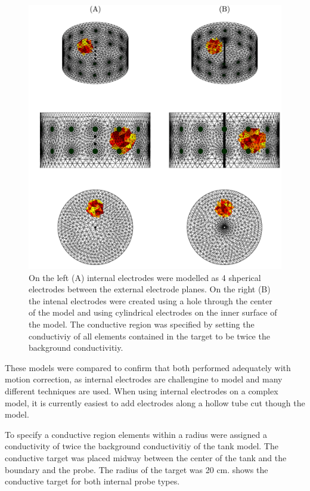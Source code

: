 \begin{figure}
    \centering
   \includegraphics[width=\textwidth]{chapter7-internal_elec_motion/imgs/probe_types.pdf} 
   \caption[Spherical and cylindrical internal electrodes]{\label{fig:probe_types} 
   On the left (A) internal electrodes were modelled as 4 shperical electrodes between the 
   external electrode planes. On the right (B) the intenal electrodes were created using 
   a hole through the center of the model and using cylindrical electrodes on the inner 
   surface of the model.
	The conductive region was specified by setting the conductiviy of all elements 
	contained in the target to be twice the background conductivitiy.}
\end{figure}

These models were compared to confirm that both 
performed adequately with motion correction, as internal electrodes 
are challengine to model and many different techniques are used. 
When using internal electrodes on a complex model, it is currently easiest 
to add electrodes along a hollow tube cut though the model. 

To specify a conductive region elements within a radius were assigned a conductivity 
of twice the background conductivitiy of the tank model.
The conductive target was placed midway between the center of the tank and the boundary
and the probe. The radius of the target was 20 cm. 
 shows the conductive target for both internal probe types.

